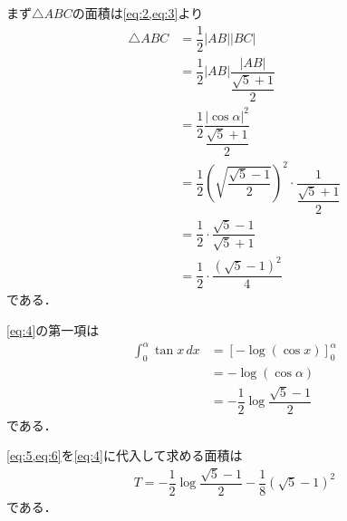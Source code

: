 \documentclass[../../main.tex]{subfiles}
\begin{document}
まず$\triangle ABC$の面積は\cref{eq:2,eq:3}より
\begin{align}
  \triangle ABC
  &=\dfrac{1}{2}|AB||BC| \\
  &=\dfrac{1}{2}|AB|\dfrac{|AB|}{\dfrac{\sqrt{5}+1}{2}} \\
  &=\dfrac{1}{2}\dfrac{|\cos\alpha|^2}{\dfrac{\sqrt{5}+1}{2}} \\
  &=\dfrac{1}{2}\left(\sqrt{\dfrac{\sqrt{5}-1}{2}}\right)^2\cdot\dfrac{1}{\dfrac{\sqrt{5}+1}{2}} \\
  &=\dfrac{1}{2}\cdot\dfrac{\sqrt{5}-1}{\sqrt{5}+1} \\
  &=\dfrac{1}{2}\cdot\dfrac{(\sqrt{5}-1)^2}{4} \label{eq:5}
\end{align}
である．

\cref{eq:4}の第一項は
\begin{align}
  \int_0^\alpha\tan x\,dx
  &=\left[-\log(\cos x)\right]_0^\alpha \\
  &=-\log(\cos\alpha) \\
  &=-\dfrac{1}{2}\log\dfrac{\sqrt{5}-1}{2} \label{eq:6}
\end{align}
である．

\cref{eq:5,eq:6}を\cref{eq:4}に代入して求める面積は
\begin{align}
  T=-\dfrac{1}{2}\log\dfrac{\sqrt{5}-1}{2}-\dfrac{1}{8}(\sqrt{5}-1)^2
\end{align}
である．
\end{document}
